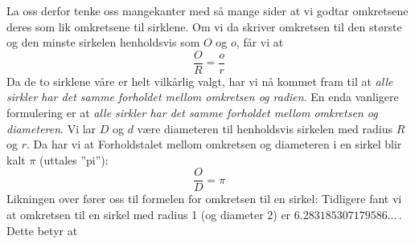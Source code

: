 {La oss derfor tenke oss mangekanter med så mange sider at vi godtar omkretsene deres som lik omkretsene til sirklene. Om vi da skriver omkretsen til den største og den minste sirkelen henholdsvis som $ O $ og $ o $, får vi at 
\[ \frac{O}{R}=\frac{o}{r} \]
Da de to sirklene våre er helt vilkårlig valgt, har vi nå kommet fram til at \textit{alle sirkler har det samme forholdet mellom omkretsen og radien}. En enda vanligere formulering er at \textit{alle sirkler har det samme forholdet mellom omkretsen og diameteren}. Vi lar $ D $ og $ d $ være diameteren til henholdsvis sirkelen med radius $ R $ og $ r $. Da har vi at
Forholdstalet mellom omkretsen og diameteren i en sirkel blir kalt $ \pi $ \index{$ \pi $}(uttales ''pi''):
\[ \frac{O}{D}=\pi \]
Likningen over fører oss til formelen for omkretsen til en sirkel:
Tidligere fant vi at omkretsen til en sirkel med radius 1 (og diameter 2) er $ 6.283185307179586... $\,. Dette betyr at
}

\newpage
{} \regv


